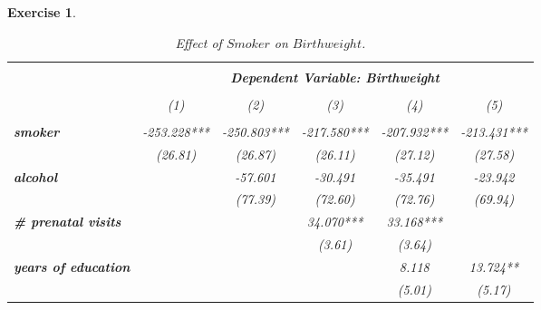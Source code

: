 \documentclass{article}
\newtheorem{exercise}[theorem]{Exercise}
\begin{document}
\begin{exercise}
\begin{table}[hp!]
\centering
\caption{Effect of $Smoker$ on $Birthweight$.}\vspace{.25cm}
\begin{adjustbox}{width=1.2\textwidth}
\begin{tabular}{l|ccccc|}
\cline{2-6}
\multicolumn{1}{c|}{\textit{}}                                         & \multicolumn{5}{c|}{\textit{}}   \\
\multicolumn{1}{c|}{\textit{}}                                         & \multicolumn{5}{c|}{\textit{\textbf{Dependent Variable: Birthweight}}}   \\
\multicolumn{1}{c|}{\textit{}}                                         & \multicolumn{5}{c|}{\textit{}}   \\
\textit{\textbf{}}                                                     & (1)         & (2)         & (3)         & (4)         & (5)              \\ \multicolumn{1}{c|}{\textit{}}                                         & \multicolumn{5}{c|}{\textit{}}   \\
\hline
\multicolumn{1}{|l|}{\textit{\textbf{smoker}}}                         & -253.228*** & -250.803*** & -217.580*** & -207.932*** & -213.431***      \\
\multicolumn{1}{|l|}{\textit{\textbf{}}}                               & (26.81)     & (26.87)     & (26.11)     & (27.12)     & (27.58)          \\
\multicolumn{1}{|l|}{\textit{\textbf{alcohol}}}                        &             & -57.601     & -30.491     & -35.491     & -23.942          \\
\multicolumn{1}{|l|}{\textit{\textbf{}}}                               &             & (77.39)     & (72.60)     & (72.76)     & (69.94)          \\
\multicolumn{1}{|l|}{\textit{\textbf{\# prenatal visits}}}             &             &             & 34.070***   & 33.168***   &                  \\
\multicolumn{1}{|l|}{\textit{\textbf{}}}                               &             &             & (3.61)      & (3.64)      &                  \\
\multicolumn{1}{|l|}{\textit{\textbf{years of education}}}             &             &             &             & 8.118       & 13.724**         \\
\multicolumn{1}{|l|}{\textit{\textbf{}}}                               &             &             &             & (5.01)      & (5.17)           \\

\end{tabular}
\end{adjustbox}
\end{table}
\end{exercise}
\end{document}
